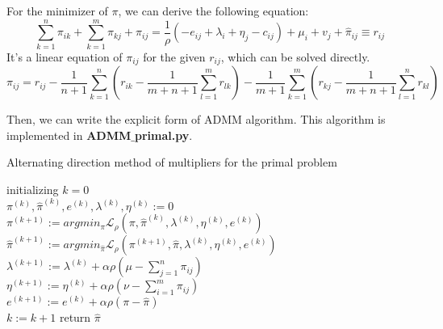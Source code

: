 \documentclass{article}
\begin{document}
For the minimizer of $\pi$, we can derive the following equation:
\begin{equation}
  \sum _ { k = 1 } ^ { n } \pi _ { i k } + \sum _ { k = 1 } ^ { m } \pi _ { k j } + \pi_ { i j } = \frac { 1 } { \rho } \left(-e _ { i j } + \lambda _ { i } + \eta _ { j } - c _ { i j } \right) + \mu _ { i } + v _ { j } + \hat{ \pi} _ { i j } \equiv r _ { i j }
\end{equation}
It's a linear equation of $\pi_{ij}$ for the given $r_{ij}$,  which can be solved directly.
\begin{equation}
\pi_ { i j } = r _ { i j } - \frac { 1 } { n + 1 } \sum _ { k = 1 } ^ { n } \left( r _ { i k } - \frac { 1 } { m + n + 1 } \sum _ { l = 1 } ^ { m } r _ { l k } \right) - \frac { 1 } { m + 1 } \sum _ { k = 1 } ^ { m } \left( r _ { k j } - \frac { 1 } { m + n + 1 } \sum _ { l = 1 } ^ { n } r _ { k l } \right)
\end{equation}

Then, we can write the explicit form of ADMM algorithm. This algorithm is implemented in \textbf{ADMM$\_$primal.py}.

\begin{algorithm}[H]
  \SetAlgoNoLine
  \caption{Alternating direction method of multipliers for the primal problem} 
  initializing $k = 0$\\
  $\pi^{(k)},\hat{\pi}^{(k)},e^{(k)},\lambda^{(k)},\eta^{(k)}:=0$\\
  {  
   $\pi^{(k+1)}:=argmin_{\pi}\mathcal{L}_{\rho}(\pi,\hat{\pi}^{(k)},\lambda^{(k)},\eta^{(k)},e^{(k)})$\\
   $\hat{\pi}^{(k+1)}:=argmin_{\hat{\pi}}\mathcal{L}_{\rho}(\pi^{(k+1)},\hat{\pi},\lambda^{(k)},\eta^{(k)},e^{(k)})$\\
   $\lambda^{(k+1)}:=\lambda^{(k)}+\alpha\rho(\mu-\sum_{j=1}^{n}\pi_{ i j })$\\
   $\eta^{(k+1)}:=\eta^{(k)}+\alpha\rho(\nu-\sum_{i=1}^{m}\pi_{ i j })$\\
   $e^{(k+1)}:=e^{(k)}+\alpha\rho(\pi-\hat{\pi})$\\
   $k:= k+1$
  }
  return $\hat{\pi}$
\end{algorithm}
\end{document}
